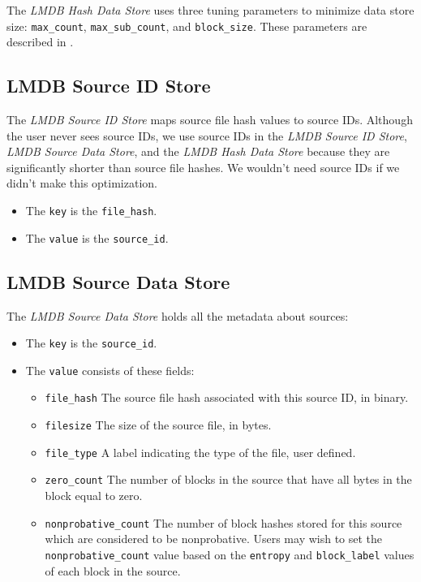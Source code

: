 \documentclass[11pt,fleqn]{article} %
\begin{document}
The \textit{LMDB Hash Data Store} uses three tuning parameters to minimize data store size: \verb+max_count+, \verb+max_sub_count+, and \verb+block_size+.  These parameters are described in \textbf{}.\\

\subsection{LMDB Source ID Store}
The \textit{LMDB Source ID Store} maps source file hash values to source IDs.  Although the user never sees source IDs, we use source IDs in the \textit{LMDB Source ID Store}, \textit{LMDB Source Data Store}, and the \textit{LMDB Hash Data Store} because they are significantly shorter than source file hashes.  We wouldn't need source IDs if we didn't make this optimization.

\begin{itemize}
\item The \verb+key+ is the \verb+file_hash+.
\item The \verb+value+ is the \verb+source_id+.
\end{itemize}

\subsection{LMDB Source Data Store}
The \textit{LMDB Source Data Store} holds all the metadata about sources:
\begin{itemize}
\item The \verb+key+ is the \verb+source_id+.
\item The \verb+value+ consists of these fields:
  \begin{itemize}
  \item \verb+file_hash+ The source file hash associated with this source ID, in binary.
  \item \verb+filesize+ The size of the source file, in bytes.
  \item \verb+file_type+ A label indicating the type of the file, user defined.
  \item \verb+zero_count+ The number of blocks in the source that have all bytes in the block equal to zero.
  \item \verb+nonprobative_count+ The number of block hashes stored for this source which are considered to be nonprobative.  Users may wish to set the \verb+nonprobative_count+ value based on the \verb+entropy+ and \verb+block_label+ values of each block in the source.
  \end{itemize}
\end{itemize}
\end{document}
